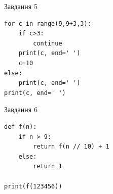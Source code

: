 \documentclass[12pt, ukrainian]{article}
\begin{document}
{\vspace{15mm}
\begin{minipage}[t]{9.7cm}                
{\begin{center}Завдання {5}\end{center}}
\begin{verbatim}
for c in range(9,9+3,3):
    if c>3:
        continue
    print(c, end=' ')
    c=10
else:
    print(c, end=' ')
print(c, end=' ')
\end{verbatim}     
\end{minipage}
\vline \hspace{8mm}
\begin{minipage}[t]{8.0cm}                
{\begin{center}Завдання {6}\end{center}}
\begin{verbatim}
def f(n):
    if n > 9:
        return f(n // 10) + 1
    else:
        return 1

print(f(123456))
\end{verbatim}     
\end{minipage}

}
\newpage
\end{document}
